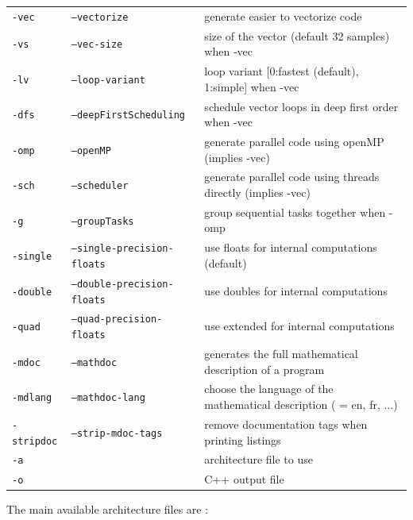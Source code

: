 \documentclass[a4paper]{book}
\begin{document}
\begin{supertabular}{|p{1.5cm}|p{4cm}|p{5cm}|}
\hline
\texttt{-vec} 				& \texttt{--vectorize}				& generate easier to vectorize code  \\
\texttt{-vs }		& \texttt{--vec-size }		& size of the vector (default 32 samples) when -vec \\
\texttt{-lv }		& \texttt{--loop-variant }	& loop variant [0:fastest (default), 1:simple] when -vec\\
\texttt{-dfs} 				& \texttt{--deepFirstScheduling}	& schedule vector loops in deep first order when -vec \\
\hline
\texttt{-omp} 				& \texttt{--openMP}					& generate parallel code using openMP (implies -vec)  \\
\texttt{-sch} 				& \texttt{--scheduler}				& generate parallel code using threads directly (implies -vec)  \\
\texttt{-g} 				& \texttt{--groupTasks}				& group sequential tasks together when -omp  \\
\hline
\texttt{-single} 			& \texttt{--single-precision-floats} & use floats for internal computations (default)  \\
\texttt{-double} 			& \texttt{--double-precision-floats} & use doubles for internal computations  \\
\texttt{-quad} 				& \texttt{--quad-precision-floats}	&  use extended for internal computations  \\
\hline
\texttt{-mdoc} 				& \texttt{--mathdoc}				& generates the full mathematical description of a \faust program \\
\texttt{-mdlang }			& \texttt{--mathdoc-lang } 		& choose the language of the mathematical description ( = en, fr, ...) \\
\texttt{-stripdoc} 			& \texttt{--strip-mdoc-tags}		& remove documentation tags when printing \faust listings\\
\hline
\texttt{-a } 	&  									& architecture file to use  \\
\texttt{-o } 	&  									& C++ output file\\
\end{supertabular} 
\normalsize

\bigskip

The main available architecture files are :

\bigskip
\end{document}
